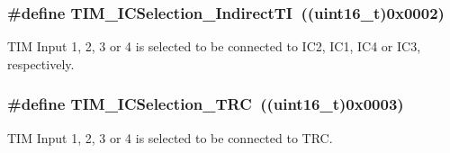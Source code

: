\subsubsection[{\texorpdfstring{T\+I\+M\+\_\+\+I\+C\+Selection\+\_\+\+Indirect\+TI}{TIM_ICSelection_IndirectTI}}]{\setlength{\rightskip}{0pt plus 5cm}\#define T\+I\+M\+\_\+\+I\+C\+Selection\+\_\+\+Indirect\+TI~((uint16\+\_\+t)0x0002)}\hypertarget{group___t_i_m___input___capture___selection_ga2289b684133ac0b81ddfcd860d01b144}{}\label{group___t_i_m___input___capture___selection_ga2289b684133ac0b81ddfcd860d01b144}
T\+IM Input 1, 2, 3 or 4 is selected to be connected to I\+C2, I\+C1, I\+C4 or I\+C3, respectively. 
\subsubsection[{\texorpdfstring{T\+I\+M\+\_\+\+I\+C\+Selection\+\_\+\+T\+RC}{TIM_ICSelection_TRC}}]{\setlength{\rightskip}{0pt plus 5cm}\#define T\+I\+M\+\_\+\+I\+C\+Selection\+\_\+\+T\+RC~((uint16\+\_\+t)0x0003)}\hypertarget{group___t_i_m___input___capture___selection_ga2cd464e97ffd6ea3208ec65672f9a373}{}\label{group___t_i_m___input___capture___selection_ga2cd464e97ffd6ea3208ec65672f9a373}
T\+IM Input 1, 2, 3 or 4 is selected to be connected to T\+RC. 